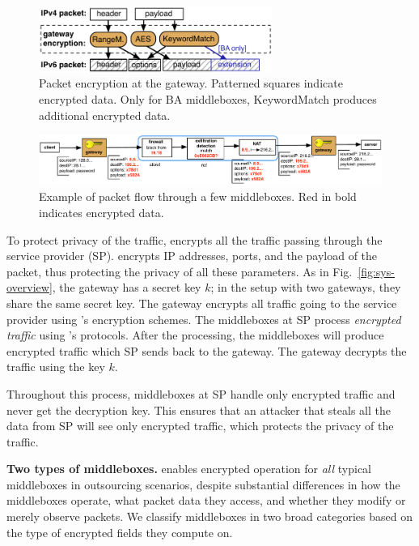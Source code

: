 \begin{figure}[t!]
\centering
  \includegraphics[width=3.0in]{fig/packet.pdf}
\caption{Packet encryption at the gateway. Patterned squares indicate encrypted data. Only for BA  middleboxes,  KeywordMatch produces additional encrypted data.  \label{fig:packet}}
\end{figure}





\begin{figure}[t!]
\centering
  \includegraphics[width=6.7in]{fig/packetpath.pdf}
\caption{Example of packet flow through a few middleboxes. Red in bold indicates encrypted data. \label{fig:packetflow}}
\end{figure}



To protect privacy of the traffic, \sys encrypts all the traffic passing through the service provider (SP).
\sys encrypts IP addresses, ports, and the payload of the packet, thus protecting the privacy of all these parameters. 
As in Fig.~\ref{fig:sys-overview}, the gateway has a secret key $k$; in the setup with two gateways, they share
the same secret key. The gateway encrypts all traffic going to the service provider using \sys's encryption schemes.
The middleboxes at SP process {\em encrypted traffic} using \sys's protocols. 
After the processing, the middleboxes
will produce encrypted traffic which SP sends back to the gateway. The gateway decrypts the traffic using the key $k$.

Throughout this process, middleboxes at SP handle only encrypted traffic and never get the decryption key. This ensures
that an attacker that steals all the data from SP will  see only encrypted traffic, which protects the privacy of the 
traffic. 


\smallskip
\noindent\textbf{Two types of middleboxes.} \sys enables encrypted operation for {\em all} typical middleboxes in outsourcing scenarios, despite substantial differences in how the middleboxes operate, what packet data they access, and whether they modify or merely observe packets.
  We classify middleboxes in  two broad categories based on the type of encrypted fields  they compute on.

